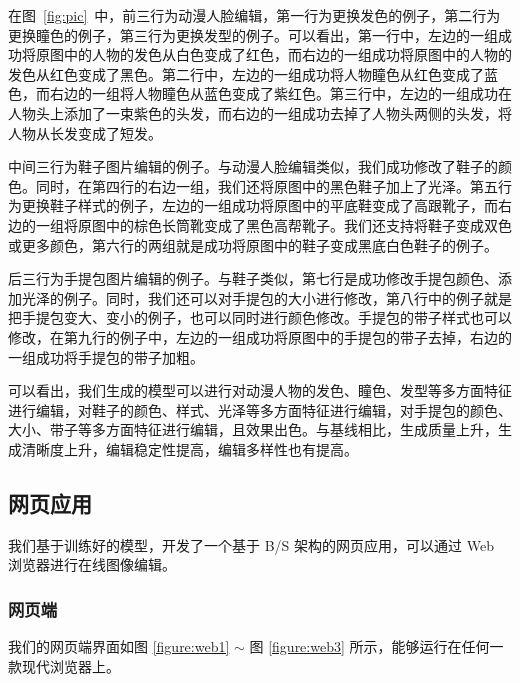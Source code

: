\documentclass[a4paper,12pt,UTF8]{ctexart}
\begin{document}
在图~\ref{fig:pic}~中，前三行为动漫人脸编辑，第一行为更换发色的例子，第二行为更换瞳色的例子，第三行为更换发型的例子。可以看出，第一行中，左边的一组成功将原图中的人物的发色从白色变成了红色，而右边的一组成功将原图中的人物的发色从红色变成了黑色。第二行中，左边的一组成功将人物瞳色从红色变成了蓝色，而右边的一组将人物瞳色从蓝色变成了紫红色。第三行中，左边的一组成功在人物头上添加了一束紫色的头发，而右边的一组成功去掉了人物头两侧的头发，将人物从长发变成了短发。

中间三行为鞋子图片编辑的例子。与动漫人脸编辑类似，我们成功修改了鞋子的颜色。同时，在第四行的右边一组，我们还将原图中的黑色鞋子加上了光泽。第五行为更换鞋子样式的例子，左边的一组成功将原图中的平底鞋变成了高跟靴子，而右边的一组将原图中的棕色长筒靴变成了黑色高帮靴子。我们还支持将鞋子变成双色或更多颜色，第六行的两组就是成功将原图中的鞋子变成黑底白色鞋子的例子。

后三行为手提包图片编辑的例子。与鞋子类似，第七行是成功修改手提包颜色、添加光泽的例子。同时，我们还可以对手提包的大小进行修改，第八行中的例子就是把手提包变大、变小的例子，也可以同时进行颜色修改。手提包的带子样式也可以修改，在第九行的例子中，左边的一组成功将原图中的手提包的带子去掉，右边的一组成功将手提包的带子加粗。

可以看出，我们生成的模型可以进行对动漫人物的发色、瞳色、发型等多方面特征进行编辑，对鞋子的颜色、样式、光泽等多方面特征进行编辑，对手提包的颜色、大小、带子等多方面特征进行编辑，且效果出色。与基线相比，生成质量上升，生成清晰度上升，编辑稳定性提高，编辑多样性也有提高。

\subsection{网页应用}

我们基于训练好的模型，开发了一个基于 B/S 架构的网页应用，可以通过 Web 浏览器进行在线图像编辑。

\subsubsection{网页端}
我们的网页端界面如图 \ref{figure:web1} $\sim$ 图 \ref{figure:web3}  所示，能够运行在任何一款现代浏览器上。
\end{document}

